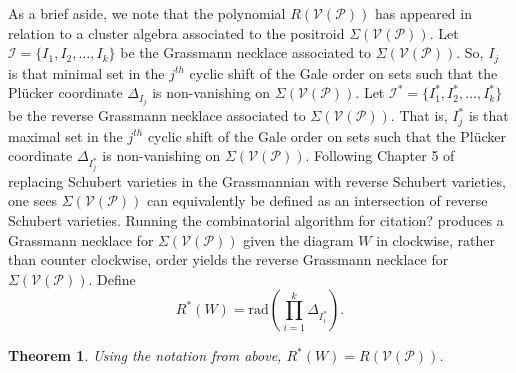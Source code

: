 \documentclass[11pt]{article}
\newcommand{\cP}{\mathcal{P}}
\newcommand{\cV}{\mathcal{V}}
\newcommand{\VP}{\cV(\cP)}
\newtheorem{thm}{Theorem}[section]
\newtheorem{lem}[thm]{Lemma}
\theoremstyle{remark}
\theoremstyle{definition}
\begin{document}
As a brief aside, we note that the polynomial $R(\VP)$ has appeared in relation to a cluster algebra associated to the positroid $\Sigma(\VP)$. Let $\mathcal{I} = \{I_1,I_2, \dots, I_k\}$ be the Grassmann necklace associated to $\Sigma(\VP)$. So, $I_j$ is that minimal set in the $j^{th}$ cyclic shift of the Gale order on sets such that the Pl\"ucker coordinate $\Delta_{I_j}$ is non-vanishing on $\Sigma(\VP)$. Let $\mathcal{I}^{\ast} = \{I^{\ast}_1, I^{\ast}_2, \dots, I^{\ast}_{k}\}$ be the reverse Grassmann necklace associated to $\Sigma(\VP)$. That is, $I^{\ast}_j$ is that maximal set in the $j^{th}$ cyclic shift of the Gale order on sets such that the Pl\"ucker coordinate $\Delta_{I^*_j}$ is non-vanishing on $\Sigma(\VP)$. Following Chapter 5 of \cite{knutsonlamspeyerjuggling} replacing Schubert varieties in the Grassmannian with reverse Schubert varieties, one sees $\Sigma(\VP)$ can equivalently be defined as an intersection of reverse Schubert varieties. Running the combinatorial algorithm for {\color{red} citation?} produces a Grassmann necklace for $\Sigma(\VP)$ given the diagram $W$ in clockwise, rather than counter clockwise, order yields the reverse Grassmann necklace for $\Sigma(\VP)$. Define
%
\begin{displaymath}
R^{\ast}(W) = \mathrm{rad}\left(\prod_{i = 1}^{k} \Delta_{I^{\ast}_i}\right).
\end{displaymath}




\begin{thm}
Using the notation from above, $R^{\ast}(W) = R(\VP)$.
\end{thm}
\end{document}
